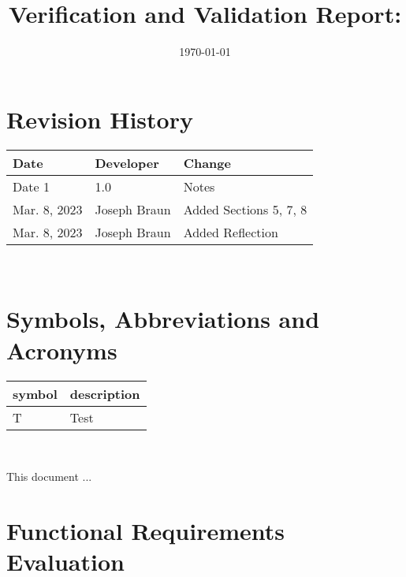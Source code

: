\documentclass[12pt, titlepage]{article}
\begin{document}
\title{Verification and Validation Report: \progname} 
\author{\authname}
\date{\today}
	
\maketitle


\section{Revision History}

\begin{tabularx}{\textwidth}{p{3cm}p{3cm}X}
\toprule {\bf Date} & {\bf Developer} & {\bf Change}\\
\midrule
Date 1 & 1.0 & Notes\\
Mar. 8, 2023 & Joseph Braun & Added Sections 5, 7, 8 \\
Mar. 8, 2023 & Joseph Braun & Added Reflection \\
\bottomrule
\end{tabularx}

~\newpage

\section{Symbols, Abbreviations and Acronyms}

\renewcommand{\arraystretch}{1.2}
\begin{tabular}{l l} 
  \toprule		
  \textbf{symbol} & \textbf{description}\\
  \midrule 
  T & Test\\
  \bottomrule
\end{tabular}\\


\newpage

\tableofcontents

\listoftables %

\listoffigures %

\newpage


This document ...

\section{Functional Requirements Evaluation}
\end{document}
